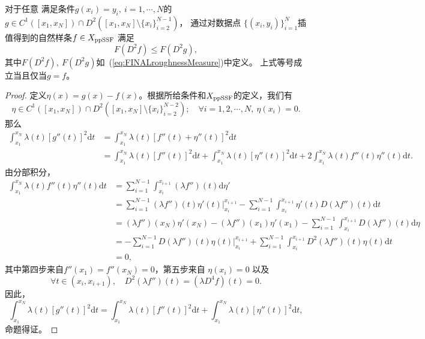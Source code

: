 \begin{lem}
  \label{lem:FINALminimumBendingEnergy}
  对于任意
  满足条件$g(x_{i})=y_{i},\ i=1,\cdots,N$的$g\in C^{1}([x_{1},x_{N}])\cap
      D^{2}([x_{1},x_{N}]\setminus \{x_{i}\}_{i=2}^{N-1})$，
  通过对数据点
  $\{(x_{i},y_{i})\}_{i=1}^{N}$插值得到的自然样条$f\in X_{\textnormal{ppSSF}}$
  满足
  \begin{equation}
    \label{eq:FINALminimumBendingEnergy}
    F(D^{2}f)\le F(D^{2}g),
  \end{equation}
  其中$F(D^{2}f),\ F(D^{2}g)$如~(\ref{eq:FINALroughnessMeasure})中定义。
  上式等号成立当且仅当$g=f$。
\end{lem}
\begin{proof}
  定义$\eta(x)=g(x)-f(x)$。根据所给条件和$X_{\textnormal{ppSSF}}$的定义，我们有
  $$\eta\in C^{1}([x_{1},x_{N}])\cap
  D^{2}([x_{1},x_{N}]\setminus \{x_{i}\}_{i=2}^{N-2});\quad
   \forall i=1,2,\cdots,N,\ \eta(x_{i})=0.$$
  那么
  \begin{align*}
    \int_{x_{1}}^{x_{N}}\lambda(t)[g''(t)]^{2}\mathrm{d}t
    &=\int_{x_{1}}^{x_{N}}\lambda(t)[f''(t)+\eta''(t)]^{2}\mathrm{d}t\\
    &=\int_{x_{1}}^{x_{N}}\lambda(t)[f''(t)]^{2}\mathrm{d}t+\int_{x_{1}}^{x_{N}}
    \lambda(t)[\eta''(t)]^{2}\mathrm{d}t
    +2\int_{x_{1}}^{x_{N}}\lambda(t)f''(t)\eta''(t)\mathrm{d}t.
  \end{align*}
  由分部积分，
  \begin{align*}
    \int_{x_{1}}^{x_{N}}\lambda(t)f''(t)\eta''(t)\mathrm{d}t
    &=\sum_{i=1}^{N-1}\int_{x_{i}}^{x_{i+1}}(\lambda f'')(t)\mathrm{d}\eta'\\
    &=\sum_{i=1}^{N-1}(\lambda f'')(t)\eta'(t)|_{x_{i}}^{x_{i+1}}
      -\sum_{i=1}^{N-1}\int_{x_{i}}^{x_{i+1}}\eta'(t)D(\lambda f'')(t)\mathrm{d}t\\
    &=(\lambda f'')(x_{N})\eta'(x_{N})-(\lambda f'')(x_{1})\eta'(x_{1})
      -\sum_{i=1}^{N-1}\int_{x_{i}}^{x_{i+1}}D(\lambda f'')(t)\mathrm{d}\eta\\
    &=-\sum_{i=1}^{N-1}D(\lambda f'')(t)\eta(t)|_{x_{i}}^{x_{i+1}}
      +\sum_{i=1}^{N-1}\int_{x_{i}}^{x_{i+1}}D^{2}(\lambda f'')(t)\eta(t)\mathrm{d}t\\
    &=0,
  \end{align*}
  其中第四步来自$f''(x_{1})=f''(x_{N})=0$，第五步来自
  $\eta(x_{i})=0$ 以及 $$\forall t\in(x_{i},x_{i+1}),\quad
  D^{2}(\lambda f'')(t)=(\lambda D^{4}f)(t)=0.$$
  因此，
  \begin{displaymath}
    \int_{x_{1}}^{x_{N}}\lambda(t)[g''(t)]^{2}\mathrm{d}t
    =\int_{x_{1}}^{x_{N}}\lambda(t)[f''(t)]^{2}\mathrm{d}t+\int_{x_{1}}^{x_{N}}
    \lambda(t)[\eta''(t)]^{2}\mathrm{d}t,
  \end{displaymath}
  命题得证。
\end{proof}

